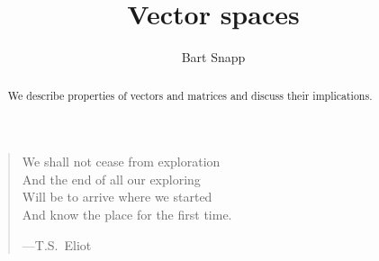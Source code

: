 \documentclass{ximera}
\author{Bart Snapp}
\title{Vector spaces}
\begin{document}
\begin{abstract}
  We describe properties of vectors and matrices and discuss their
  implications.
\end{abstract}
\maketitle

\begin{quote}
  We shall not cease from exploration\\
  And the end of all our exploring\\
  Will be to arrive where we started\\
  And know the place for the first time.

  \hfill ---T.S.\ Eliot
\end{quote}
\end{document}
